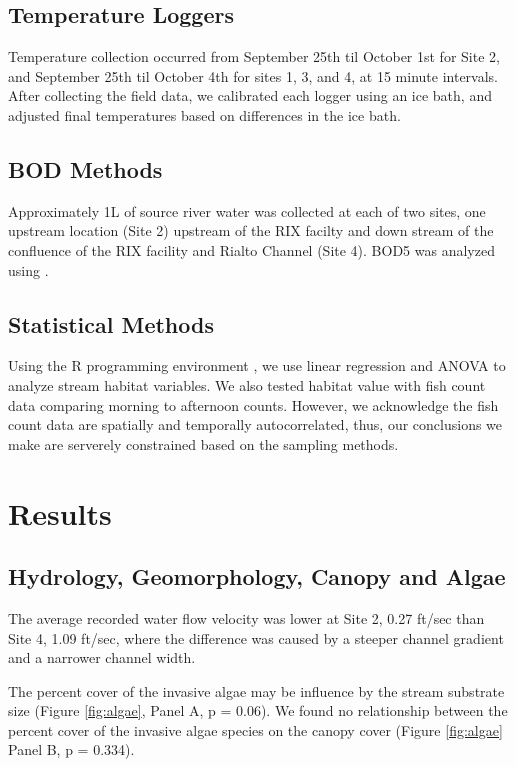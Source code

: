 \documentclass{article}\usepackage[]{graphicx}\usepackage[]{color}
\begin{document}
\subsection{Temperature Loggers}

Temperature collection occurred from September 25th til October 1st for Site 2, and September 25th til October 4th for sites 1, 3, and 4, at 15 minute intervals. After collecting the field data, we calibrated each logger using an ice bath, and adjusted final temperatures based on differences in the ice bath.

\subsection{BOD Methods}

Approximately 1L of source river water was collected at each of two sites, one upstream location (Site 2) upstream of the RIX facilty and down stream of the confluence of the RIX facility and Rialto Channel (Site 4). BOD5 was analyzed using \citet{rice2012standard}. 

\subsection{Statistical Methods}

Using the R programming environment \citep{CRAN}, we use linear regression and ANOVA to analyze stream habitat variables. We also tested habitat value with fish count data comparing morning to afternoon counts. However, we acknowledge the fish count data are spatially and temporally autocorrelated, thus, our conclusions we make are serverely constrained based on the sampling methods.

\section{Results}



\subsection{Hydrology, Geomorphology, Canopy and Algae}

The average recorded water flow velocity was lower at Site 2, 0.27 ft/sec than Site 4, 1.09 ft/sec, where the difference was caused by a steeper channel gradient and a narrower channel width. 

The percent cover of the invasive algae may be influence by the stream substrate size (Figure \ref{fig:algae}, Panel A, p = 0.06). We found no relationship between the percent cover of the invasive algae species on the canopy cover (Figure \ref{fig:algae} Panel B, p = 0.334).
\end{document}
